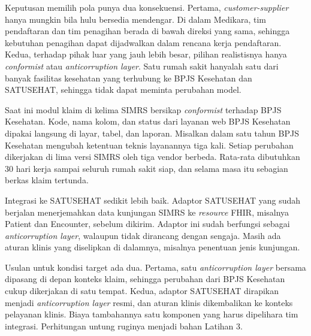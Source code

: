 Keputusan memilih pola punya dua konsekuensi. Pertama, \textit{customer-supplier} hanya mungkin
bila hulu bersedia mendengar. Di dalam Medikara, tim pendaftaran dan tim penagihan berada di bawah
direksi yang sama, sehingga kebutuhan penagihan dapat dijadwalkan dalam rencana kerja pendaftaran.
Kedua, terhadap pihak luar yang jauh lebih besar, pilihan realistisnya hanya \textit{conformist}
atau \textit{anticorruption layer}. Satu rumah sakit hanyalah satu dari banyak fasilitas kesehatan
yang terhubung ke BPJS Kesehatan dan SATUSEHAT, sehingga tidak dapat meminta perubahan model.

\begin{kasus}[title={Kasus Medikara Health: BPJS Kesehatan dan SATUSEHAT}]
  Saat ini modul klaim di kelima SIMRS bersikap \textit{conformist} terhadap BPJS Kesehatan. Kode,
  nama kolom, dan status dari layanan web BPJS Kesehatan dipakai langsung di layar, tabel, dan
  laporan. Misalkan dalam satu tahun BPJS Kesehatan mengubah ketentuan teknis layanannya tiga kali.
  Setiap perubahan dikerjakan di lima versi SIMRS oleh tiga vendor berbeda. Rata-rata dibutuhkan 30
  hari kerja sampai seluruh rumah sakit siap, dan selama masa itu sebagian berkas klaim tertunda.

  Integrasi ke SATUSEHAT sedikit lebih baik. Adaptor SATUSEHAT yang sudah berjalan menerjemahkan
  data kunjungan SIMRS ke \textit{resource} FHIR, misalnya Patient dan Encounter, sebelum dikirim.
  Adaptor ini sudah berfungsi sebagai \textit{anticorruption layer}, walaupun tidak dirancang dengan
  sengaja. Masih ada aturan klinis yang diselipkan di dalamnya, misalnya penentuan jenis kunjungan.

  Usulan untuk kondisi target ada dua. Pertama, satu \textit{anticorruption layer} bersama
  dipasang di depan konteks klaim, sehingga perubahan dari BPJS Kesehatan cukup dikerjakan di satu
  tempat. Kedua, adaptor SATUSEHAT dirapikan menjadi \textit{anticorruption layer} resmi, dan aturan
  klinis dikembalikan ke konteks pelayanan klinis. Biaya tambahannya satu komponen yang harus
  dipelihara tim integrasi. Perhitungan untung ruginya menjadi bahan Latihan 3.
\end{kasus}

